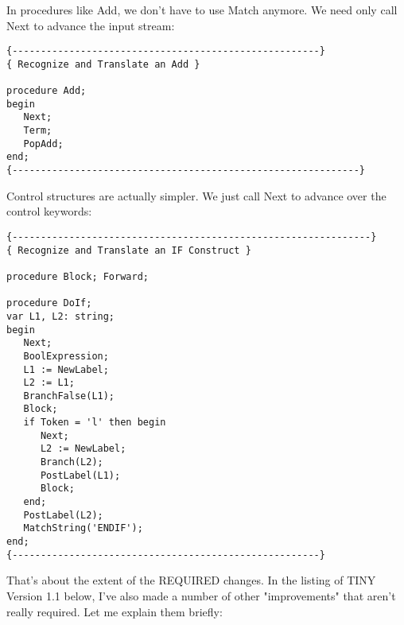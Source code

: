 In procedures like Add, we don't  have  to use Match anymore. We need only call Next to advance the input stream:

\begin{verbatim}
{------------------------------------------------------}
{ Recognize and Translate an Add }

procedure Add;
begin
   Next;
   Term;
   PopAdd;
end;
{-------------------------------------------------------------}
\end{verbatim}

Control  structures  are  actually simpler. We just call Next to advance over the control keywords:

\begin{verbatim}
{---------------------------------------------------------------}
{ Recognize and Translate an IF Construct }

procedure Block; Forward;

procedure DoIf;
var L1, L2: string;
begin
   Next;
   BoolExpression;
   L1 := NewLabel;
   L2 := L1;
   BranchFalse(L1);
   Block;
   if Token = 'l' then begin
      Next;
      L2 := NewLabel;
      Branch(L2);
      PostLabel(L1);
      Block;
   end;
   PostLabel(L2);
   MatchString('ENDIF');
end;
{------------------------------------------------------}
\end{verbatim}

That's about the extent of the REQUIRED changes. In  the listing of TINY  Version  1.1  below, I've  also  made a number of other "improvements" that  aren't really required. Let me explain them briefly:

